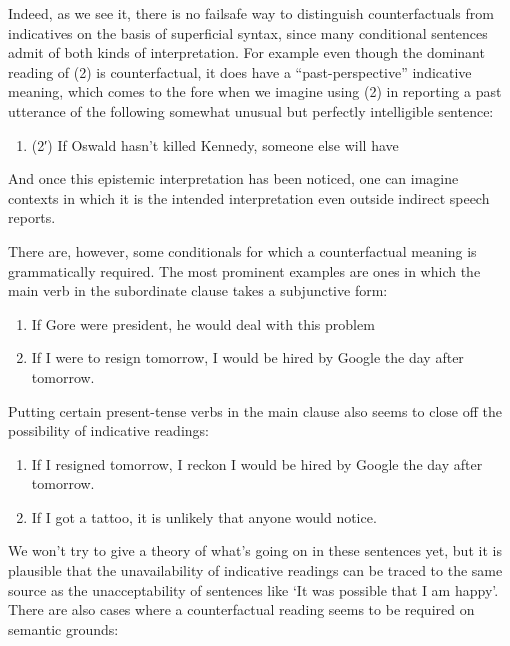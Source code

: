 Indeed, as we see it, there is no failsafe way to distinguish
counterfactuals from indicatives on the basis of superficial syntax,
since many conditional sentences admit of both kinds of interpretation.
For example even though the dominant reading of (2) is counterfactual,
it does have a ``past-perspective'' indicative meaning, which comes to
the fore when we imagine using (2) in reporting a past utterance of the
following somewhat unusual but perfectly intelligible sentence:

\begin{enumerate}
\def\labelenumi{(\arabic{enumi})}
\setcounter{enumi}{12}
\itemsep1pt\parskip0pt
\item
  (2′) If Oswald hasn't killed Kennedy, someone else will have
\end{enumerate}

And once this epistemic interpretation has been noticed, one can imagine
contexts in which it is the intended interpretation even outside
indirect speech reports.

There are, however, some conditionals for which a counterfactual meaning
is grammatically required. The most prominent examples are ones in which
the main verb in the subordinate clause takes a subjunctive form:

\begin{enumerate}
\def\labelenumi{(\arabic{enumi})}
\setcounter{enumi}{13}
\item
  If Gore were president, he would deal with this problem
\item
  If I were to resign tomorrow, I would be hired by Google the day after
  tomorrow.
\end{enumerate}

Putting certain present-tense verbs in the main clause also seems to
close off the possibility of indicative readings:

\begin{enumerate}
\def\labelenumi{(\arabic{enumi})}
\setcounter{enumi}{15}
\item
  If I resigned tomorrow, I reckon I would be hired by Google the day
  after tomorrow.
\item
  If I got a tattoo, it is unlikely that anyone would notice.
\end{enumerate}

We won't try to give a theory of what's going on in these sentences yet,
but it is plausible that the unavailability of indicative readings can
be traced to the same source as the unacceptability of sentences like
`It was possible that I am happy'. There are also cases where a
counterfactual reading seems to be required on semantic grounds:

